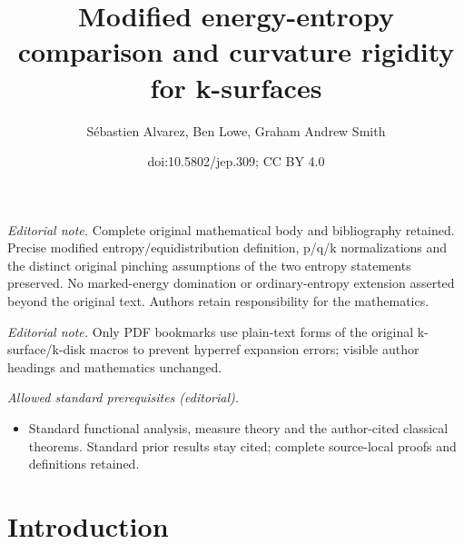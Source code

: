 \documentclass[10pt]{amsart}
\title{Modified energy-entropy comparison and curvature rigidity for k-surfaces}
\author{Sébastien Alvarez, Ben Lowe, Graham Andrew Smith}
\date{doi:10.5802/jep.309; CC BY 4.0}
\theoremstyle{plain}
\theoremstyle{definition}
\providecommand{\mainmatter}{}\providecommand{\backmatter}{}
\begin{document}
\maketitle
\noindent\textit{Editorial note.} Complete original mathematical body and bibliography retained. Precise modified entropy/equidistribution definition, p/q/k normalizations and the distinct original pinching assumptions of the two entropy statements preserved. No marked-energy domination or ordinary-entropy extension asserted beyond the original text. Authors retain responsibility for the mathematics.\par\medskip
\noindent\textit{Editorial note.} Only PDF bookmarks use plain-text forms of the original k-surface/k-disk macros to prevent hyperref expansion errors; visible author headings and mathematics unchanged.\par\medskip
\noindent\textit{Allowed standard prerequisites (editorial).}\begin{itemize}
\item Standard functional analysis, measure theory and the author-cited classical theorems. Standard prior results stay cited; complete source-local proofs and definitions retained.
\end{itemize}\medskip

\tableofcontents
\mainmatter

\section{Introduction}
\end{document}
